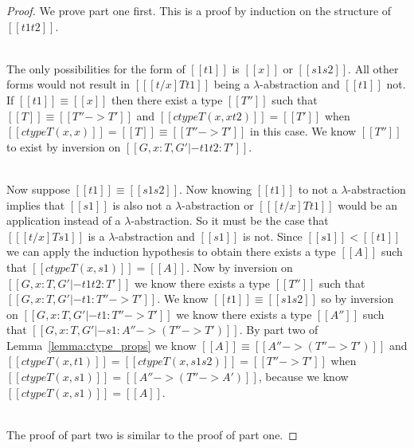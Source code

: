 \begin{proof}
  We prove part one first. This is a proof by induction on the structure of $[[t1 t2]]$.

  \ \\
  The only possibilities for the form of $[[t1]]$ is $[[x]]$ or $[[s1 s2]]$.  All other 
  forms would not result in $[[ [t/x] T t1]]$ being a $\lambda$-abstraction and $[[t1]]$ not.
  If $[[t1]] \equiv [[x]]$ then there exist a type $[[T'']]$ such that $[[T]] \equiv [[T'' -> T']]$ and
  $[[ctype T (x,x t2)]] = [[T']]$ when $[[ctype T (x,x)]] = [[T]] \equiv [[T'' -> T']]$ in this case.  We know
  $[[T'']]$ to exist by inversion on $[[G,x:T,G' |- t1 t2:T']]$.

  \ \\
  Now suppose $[[t1]] \equiv [[s1 s2]]$.  Now knowing $[[t1]]$ to not a $\lambda$-abstraction
  implies that $[[s1]]$ is also not a $\lambda$-abstraction or $[[ [t/x] T t1]]$ would be an application
  instead of a $\lambda$-abstraction.  So it must be the case that $[[ [t/x] T s1]]$ is a $\lambda$-abstraction
  and $[[s1]]$ is not.  Since $[[s1]] < [[t1]]$ we can apply the induction hypothesis to obtain there exists
  a type $[[A]]$ such that $[[ctype T (x,s1)]] = [[A]]$.  
  Now by inversion on $[[G,x:T,G' |- t1 t2:T']]$ we know there exists a type $[[T'']]$ such that
  $[[G,x:T,G' |- t1:T'' -> T']]$.  We know $[[t1]] \equiv [[s1 s2]]$ so by inversion on
  $[[G,x:T,G' |- t1:T'' -> T']]$ we know there exists a type $[[A'']]$ such that
  $[[G,x:T,G' |- s1:A'' -> (T'' -> T')]]$.
  By part two of Lemma~\ref{lemma:ctype_props} we know $[[A]] \equiv [[A'' -> (T'' -> T')]]$ and
  $[[ctype T (x,t1)]] = [[ctype T (x,s1 s2)]] = [[T'' -> T']]$ 
  when $[[ctype T (x,s1)]] = [[A'' -> (T'' -> A')]]$, because we know $[[ctype T (x,s1)]] = [[A]]$.

  \ \\
  The proof of part two is similar to the proof of part one.
\end{proof}
